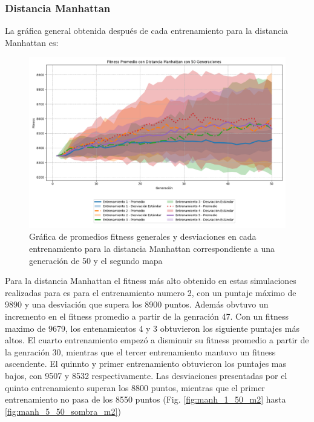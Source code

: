 \documentclass[conference]{IEEEtran}
\begin{document}
\subsubsection{Distancia Manhattan}
La gráfica general obtenida después de cada entrenamiento para la distancia Manhattan es:
\begin{figure}[H]
    \centering
    \includegraphics[width=0.9\linewidth]{Manhattan/Mapa2/Fitness_Prom_Map2_Manh_50Gen.png}
    \caption{Gráfica de promedios fitness generales y desviaciones en cada entrenamiento para la distancia Manhattan correspondiente a una generación de 50 y el segundo mapa}
    \label{fig:man_mapa_2}
\end{figure}

Para la distancia Manhattan el fitness más alto obtenido en estas simulaciones realizadas para es para el entrenamiento numero 2, con un puntaje máximo de 9890 y una desviación que supera los 8900 puntos. Además obvtuvo un incremento en el fitness promedio a partir de la genración 47. Con un fitness maximo de 9679, los entenamientos 4 y 3 obtuvieron los siguiente puntajes más altos. El cuarto entrenamiento empezó a disminuir su fitness promedio a partir de la genración 30, mientras que el tercer entrenamiento mantuvo un fitness ascendente. El quinnto y primer entrenamiento obtuvieron los puntajes mas bajos, con 9507 y 8532 respectivamente. Las desviaciones presentadas por el quinto entrenamiento superan los 8800 puntos, mientras que el primer entrenamiento no pasa de los 8550 puntos (Fig. \ref{fig:manh_1_50_m2} hasta \ref{fig:manh_5_50_sombra_m2})
\end{document}
